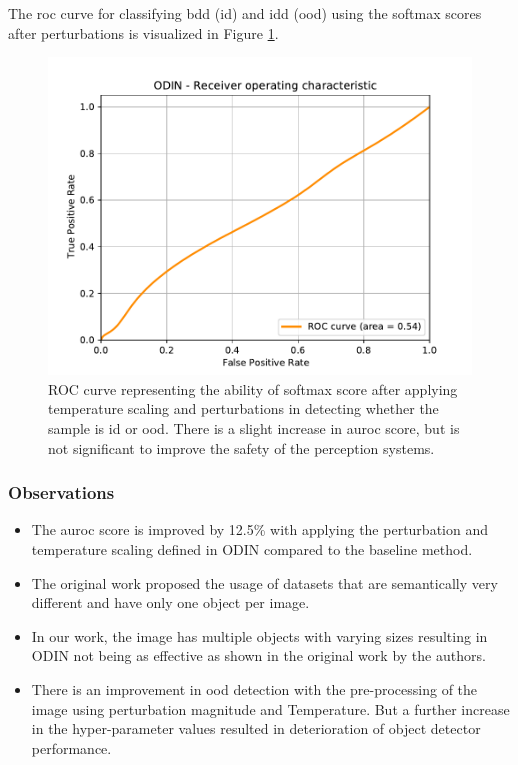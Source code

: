     The \acrshort{roc} curve for classifying \acrshort{bdd} (\acrshort{id}) and \acrshort{idd} (\acrshort{ood}) using the softmax scores after perturbations is visualized in Figure \ref{fig:ODIN_ROC}. 
    
    \begin{figure}
        \centering
        \includegraphics[scale=0.5]{images/ROC/BDD100K vs IDD_ODIN_ROC.pdf}
        \caption[ROC curve for \acrshort{ood} detection using ODIN generated softmax probability score]{ROC curve representing the ability of softmax score after applying temperature scaling and perturbations in detecting whether the sample is \acrlong{id} or \acrlong{ood}. There is a slight increase in \acrshort{auroc} score, but is not significant to improve the safety of the perception systems.}
        \label{fig:ODIN_ROC}
    \end{figure}
    
    \subsubsection{Observations}
    \begin{itemize}
        \item The \acrshort{auroc} score is improved by 12.5\% with applying the perturbation and temperature scaling defined in ODIN compared to the baseline method.
        \item The original work proposed the usage of datasets that are semantically very different and have only one object per image.
        \item In our work, the image has multiple objects with varying sizes resulting in ODIN not being as effective as shown in the original work by the authors.
        \item There is an improvement in \acrshort{ood} detection with the pre-processing of the image using perturbation magnitude and Temperature. But a further increase in the hyper-parameter values resulted in deterioration of object detector performance. 
    \end{itemize}
